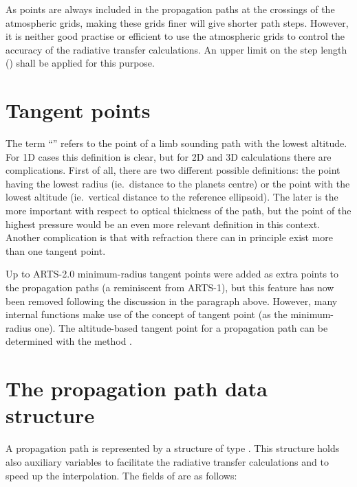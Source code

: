 As points are always included in the propagation paths at the crossings of the
atmospheric grids, making these grids finer will give shorter path steps.
However, it is neither good practise or efficient to use the atmospheric grids
to control the accuracy of the radiative transfer calculations. An upper limit
on the step length () shall be applied for this
purpose.


\section{Tangent points}
The term ``'' refers to the point of a limb sounding
path with the lowest altitude. For 1D cases this definition is clear, but for
2D and 3D calculations there are complications. First of all, there are two
different possible definitions: the point having the lowest radius (ie.\
distance to the planets centre) or the point with the lowest altitude (ie.\
vertical distance to the reference ellipsoid). The later is the more important
with respect to optical thickness of the path, but the point of the highest
pressure would be an even more relevant definition in this context. Another
complication is that with refraction there can in principle exist more than one
tangent point.

Up to ARTS-2.0 minimum-radius tangent points were added as extra points to the
propagation paths (a reminiscent from ARTS-1), but this feature has now been
removed following the discussion in the paragraph above. However, many internal
functions make use of the concept of tangent point (as the minimum-radius
one). The altitude-based tangent point for a propagation path can be determined
with the method \wsmindex{TangentPointExtract}.



\section{The propagation path data structure}
\label{sec:ppath:Ppath}

A propagation path is represented by a structure of type
. This structure holds also auxiliary variables to
facilitate the radiative transfer calculations and to speed up the
interpolation. The fields of \builtindoc{Ppath} are as follows:

